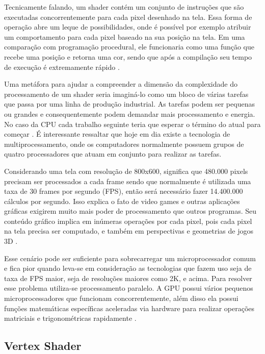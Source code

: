 Tecnicamente falando, um shader contém um conjunto de instruções que são executadas concorrentemente para cada pixel desenhado na tela. Essa forma de operação abre um leque de possibilidades, onde é possível por exemplo atribuir um comportamento para cada pixel baseado na sua posição na tela. Em uma comparação com programação procedural, ele funcionaria como uma função que recebe uma posição e retorna uma cor, sendo que após a compilação seu tempo de execução é extremamente rápido \cite{bookOfShaders}.

Uma metáfora para ajudar a compreender a dimensão da complexidade do processamento de um shader seria imaginá-lo como um bloco de várias tarefas que passa por uma linha de produção industrial. As tarefas podem ser pequenas ou grandes e consequentemente podem demandar mais processamento e energia. No caso da CPU cada trabalho seguinte teria que esperar o término do atual para começar \cite{bookOfShaders}. É interessante ressaltar que hoje em dia existe a tecnologia de multiprocessamento, onde os computadores normalmente possuem grupos de quatro processadores que atuam em conjunto para realizar as tarefas.

Considerando uma tela com resolução de 800x600, significa que 480.000 pixels precisam ser processados a cada frame sendo que normalmente é utilizada uma taxa de 30 frames por segundo (\acrshort{FPS}), então será necessário fazer 14.400.000 cálculos por segundo. Isso explica o fato de video games e outras aplicações gráficas exigirem muito mais poder de processamento que outros programas. Seu conteúdo gráfico implica em inúmeras operações por cada pixel, pois cada pixel na tela precisa ser computado, e também em perspectivas e geometrias de jogos 3D \cite{bookOfShaders}.  

Esse cenário pode ser suficiente para sobrecarregar um microprocessador comum e fica pior quando leva-se em consideração as tecnologias que fazem uso seja de taxa de FPS maior, seja de resoluções maiores como 2K, e acima. Para resolver esse problema utiliza-se processamento paralelo. A GPU possui vários pequenos microprocessadores que funcionam concorrentemente, além disso ela possui funções matemáticas específicas aceleradas via hardware para realizar operações matriciais e trigonométricas rapidamente \cite{bookOfShaders}.


\subsection{Vertex Shader}

